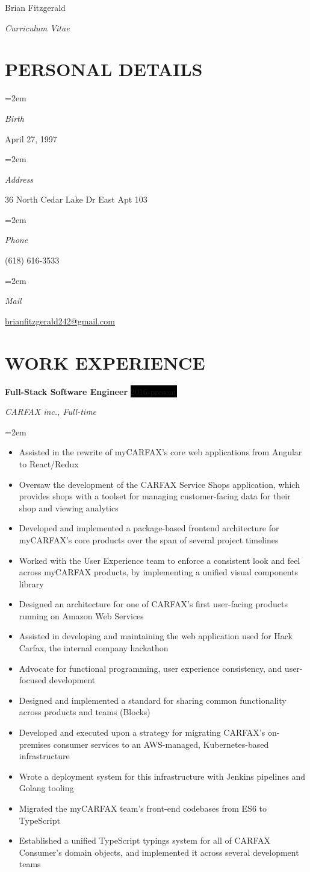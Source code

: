\documentclass[paper=a4,fontsize=11pt]{scrartcl} %
\newlength{\spacebox}
\newcommand{\sepspace}{\vspace*{1em}}		%
\newcommand{\MyName}[1]{ %
			\Huge \usefont{OT1}{phv}{b}{n} \hfill #1
			\par \normalsize \normalfont}
\newcommand{\MySlogan}[1]{ %
			\large \usefont{OT1}{phv}{m}{n}\hfill \textit{#1}
			\par \normalsize \normalfont}
\newcommand{\NewPart}[1]{\section*{\uppercase{#1}}}
\newcommand{\PersonalEntry}[2]{
			\noindent\hangindent=2em\hangafter=0 %
			\parbox{\spacebox}{        %
			\textit{#1}}		       %
			\hspace{1.5em} #2 \par}    %
\newcommand{\EducationEntry}[4]{
			\noindent \textbf{#1} \hfill      %
			\colorbox{Black}{%
				\parbox{6em}{%
				\hfill\color{White}#2}} \par  %
			\noindent \textit{#3} \par        %
			\noindent\hangindent=2em\hangafter=0 \small #4 %
			\normalsize \par}
\newcommand{\WorkEntry}[4]{				  %
			\noindent \textbf{#1} \hfill      %
			\colorbox{Black}{\color{White}#2} \par  %
			\noindent \textit{#3} \par              %
			\noindent\hangindent=2em\hangafter=0 \small #4 %
			\normalsize \par}
\begin{document}
	
	\MyName{Brian Fitzgerald}
	\MySlogan{Curriculum Vitae}
	
	\sepspace
	
	\NewPart{Personal details}{}
	
	\PersonalEntry{Birth}{April 27, 1997}
	\PersonalEntry{Address}{36 North Cedar Lake Dr East Apt 103}
	\PersonalEntry{Phone}{(618) 616-3533}
	\PersonalEntry{Mail}{\url{brianfitzgerald242@gmail.com}}
	
	\NewPart{Work experience}{}
	
	\WorkEntry{Full-Stack Software Engineer}{2016-present}{CARFAX inc., Full-time}{
		\begin{itemize}
			\item Assisted in the rewrite of myCARFAX's core web applications from Angular to React/Redux
			\item Oversaw the development of the CARFAX Service Shops application, which provides shops with a toolset for managing customer-facing data for their shop and viewing analytics
			\item Developed and implemented a package-based frontend architecture for myCARFAX's core products over the span of several project timelines
			\item Worked with the User Experience team to enforce a consistent look and feel across myCARFAX products, by implementing a unified visual components library
			\item Designed an architecture for one of CARFAX's first user-facing products running on Amazon Web Services
			\item Assisted in developing and maintaining the web application used for Hack Carfax, the internal company hackathon
			\item Advocate for functional programming, user experience consistency, and user-focused development
			\item Designed and implemented a standard for sharing common functionality across products and teams (Blocks)
			\item Developed and executed upon a strategy for migrating CARFAX's on-premises consumer services to an AWS-managed, Kubernetes-based infrastructure
			\item Wrote a deployment system for this infrastructure with Jenkins pipelines and Golang tooling
			\item Migrated the myCARFAX team's front-end codebases from ES6 to TypeScript
			\item Established a unified TypeScript typings system for all of CARFAX Consumer's domain objects, and implemented it across several development teams
		\end{itemize}
	}
	\sepspace
	
\end{document}
